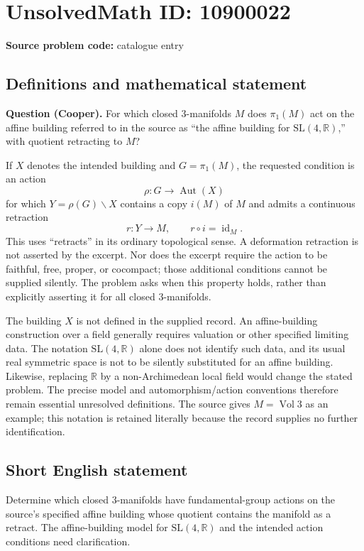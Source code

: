 \documentclass[11pt]{article}
\newcommand{\R}{\mathbb{R}}
\begin{document}
\section*{UnsolvedMath ID: 10900022}
\textbf{Source problem code:} catalogue entry
\subsection{Definitions and mathematical statement}
\textbf{Question (Cooper).} For which closed $3$-manifolds $M$ does $\pi_1(M)$ act on the affine building referred to in the source as ``the affine building for $\mathrm{SL}(4,\R)$,'' with quotient retracting to $M$?

If $X$ denotes the intended building and $G=\pi_1(M)$, the requested condition is an action
\[
 \rho:G\longrightarrow\operatorname{Aut}(X)
\]
for which $Y=\rho(G)\backslash X$ contains a copy $i(M)$ of $M$ and admits a continuous retraction
\[
 r:Y\longrightarrow M,\qquad r\circ i=\operatorname{id}_M.
\]
This uses ``retracts'' in its ordinary topological sense. A deformation retraction is not asserted by the excerpt. Nor does the excerpt require the action to be faithful, free, proper, or cocompact; those additional conditions cannot be supplied silently. The problem asks when this property holds, rather than explicitly asserting it for all closed $3$-manifolds.

The building $X$ is not defined in the supplied record. An affine-building construction over a field generally requires valuation or other specified limiting data. The notation $\mathrm{SL}(4,\R)$ alone does not identify such data, and its usual real symmetric space is not to be silently substituted for an affine building. Likewise, replacing $\R$ by a non-Archimedean local field would change the stated problem. The precise model and automorphism/action conventions therefore remain essential unresolved definitions. The source gives $M=\operatorname{Vol}3$ as an example; this notation is retained literally because the record supplies no further identification.
\subsection{Short English statement}
Determine which closed $3$-manifolds have fundamental-group actions on the source's specified affine building whose quotient contains the manifold as a retract. The affine-building model for $\mathrm{SL}(4,\R)$ and the intended action conditions need clarification.
\end{document}
